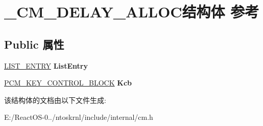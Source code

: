 \hypertarget{struct___c_m___d_e_l_a_y___a_l_l_o_c}{}\section{\+\_\+\+C\+M\+\_\+\+D\+E\+L\+A\+Y\+\_\+\+A\+L\+L\+O\+C结构体 参考}
\label{struct___c_m___d_e_l_a_y___a_l_l_o_c}
\subsection*{Public 属性}
\begin{DoxyCompactItemize}
\item 
\mbox{\label{struct___c_m___d_e_l_a_y___a_l_l_o_c_ace79cf89ffc8dbc727fd679146ee050b}} 
\hyperlink{struct___l_i_s_t___e_n_t_r_y}{L\+I\+S\+T\+\_\+\+E\+N\+T\+RY} {\bfseries List\+Entry}
\item 
\mbox{\label{struct___c_m___d_e_l_a_y___a_l_l_o_c_aa61c2535a5751df320a2125078b5e166}} 
\hyperlink{struct___c_m___k_e_y___c_o_n_t_r_o_l___b_l_o_c_k}{P\+C\+M\+\_\+\+K\+E\+Y\+\_\+\+C\+O\+N\+T\+R\+O\+L\+\_\+\+B\+L\+O\+CK} {\bfseries Kcb}
\end{DoxyCompactItemize}


该结构体的文档由以下文件生成\+:\begin{DoxyCompactItemize}
\item 
E\+:/\+React\+O\+S-\/0../ntoskrnl/include/internal/cm.\+h\end{DoxyCompactItemize}
